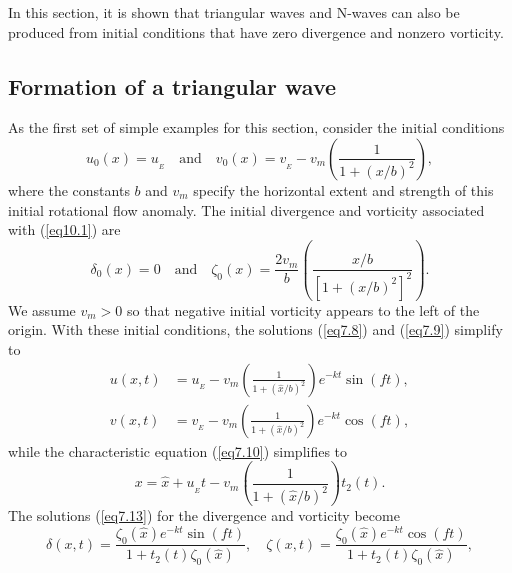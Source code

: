 \documentclass[10pt]{article}
\begin{document}
     In this section, it is shown that triangular waves and N-waves can also be
produced from initial conditions that have zero divergence and nonzero vorticity.

\subsection{Formation of a triangular wave}

     As the first set of simple examples for this section, consider the initial
conditions
\begin{equation}                                  %
       u_0(x) = u_{_E}  \quad \text{and} \quad v_0(x) = v_{_E} - v_m \left(\frac{1}{1 + (x/b)^2}\right),
\label{eq10.1}
\end{equation}
where the constants $b$ and $v_m$ specify the horizontal extent and strength of this
initial rotational flow anomaly. The initial divergence and vorticity associated
with (\ref{eq10.1}) are
\begin{equation}                                  %
     \delta_0(x) = 0  \quad \text{and} \quad
     \zeta_0(x)  = \frac{2v_m}{b} \left(\frac{x/b}{[1 + (x/b)^2]^2}\right).
\label{eq10.2}
\end{equation}
We assume $v_m>0$ so that negative initial vorticity appears to the left
of the origin. With these initial conditions, the solutions (\ref{eq7.8})
and (\ref{eq7.9}) simplify to
\begin{equation}                                  %
  \begin{split}
       u(x,t) &= u_{_E} - v_m\left(\frac{1}{1 + (\hat{x}/b)^2}\right)e^{-kt}\sin(ft), \\
       v(x,t) &= v_{_E} - v_m\left(\frac{1}{1 + (\hat{x}/b)^2}\right)e^{-kt}\cos(ft),
  \end{split}
\label{eq10.3}
\end{equation}
while the characteristic equation (\ref{eq7.10}) simplifies to
\begin{equation}                                  %
       x = \hat{x} + u_{_E}t - v_m\left(\frac{1}{1 + (\hat{x}/b)^2}\right)t_2(t).
\label{eq10.4}
\end{equation}
The solutions (\ref{eq7.13}) for the divergence and vorticity become
\begin{equation}                                  %
       \delta(x,t) = \frac{\zeta_0(\hat{x})e^{-kt}\sin(ft)}{1 + t_2(t)\zeta_0(\hat{x})},   \quad
       \zeta (x,t) = \frac{\zeta_0(\hat{x})e^{-kt}\cos(ft)}{1 + t_2(t)\zeta_0(\hat{x})},
\label{eq10.5}
\end{equation}
\end{document}
